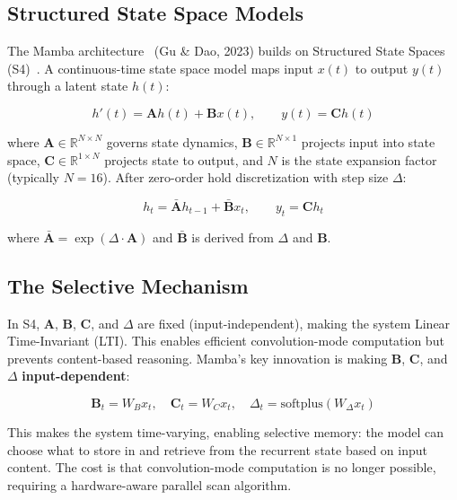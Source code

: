 \documentclass[11pt,letterpaper]{article}
\begin{document}
\subsection{Structured State Space Models}

The Mamba architecture~\cite{mamba} (Gu \& Dao, 2023) builds on Structured State Spaces (S4)~\cite{s4}. A continuous-time state space model maps input $x(t)$ to output $y(t)$ through a latent state $h(t)$:

\begin{equation}
    h'(t) = \mathbf{A} h(t) + \mathbf{B} x(t), \qquad y(t) = \mathbf{C} h(t)
    \label{eq:ssm-continuous}
\end{equation}

where $\mathbf{A} \in \mathbb{R}^{N \times N}$ governs state dynamics, $\mathbf{B} \in \mathbb{R}^{N \times 1}$ projects input into state space, $\mathbf{C} \in \mathbb{R}^{1 \times N}$ projects state to output, and $N$ is the state expansion factor (typically $N=16$). After zero-order hold discretization with step size $\Delta$:

\begin{equation}
    h_t = \bar{\mathbf{A}} h_{t-1} + \bar{\mathbf{B}} x_t, \qquad y_t = \mathbf{C} h_t
    \label{eq:ssm-discrete}
\end{equation}

where $\bar{\mathbf{A}} = \exp(\Delta \cdot \mathbf{A})$ and $\bar{\mathbf{B}}$ is derived from $\Delta$ and $\mathbf{B}$.

\subsection{The Selective Mechanism}

In S4, $\mathbf{A}$, $\mathbf{B}$, $\mathbf{C}$, and $\Delta$ are fixed (input-independent), making the system Linear Time-Invariant (LTI). This enables efficient convolution-mode computation but prevents content-based reasoning. Mamba's key innovation is making $\mathbf{B}$, $\mathbf{C}$, and $\Delta$ \textbf{input-dependent}:

\begin{equation}
    \mathbf{B}_t = W_B x_t, \quad \mathbf{C}_t = W_C x_t, \quad \Delta_t = \text{softplus}(W_\Delta x_t)
    \label{eq:selective}
\end{equation}

This makes the system time-varying, enabling selective memory: the model can choose what to store in and retrieve from the recurrent state based on input content. The cost is that convolution-mode computation is no longer possible, requiring a hardware-aware parallel scan algorithm.
\end{document}

